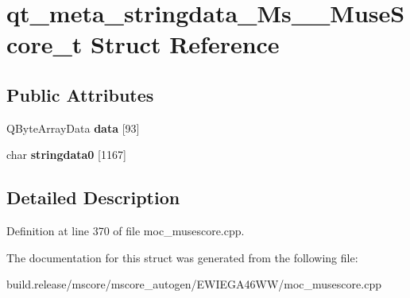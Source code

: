 \hypertarget{structqt__meta__stringdata___ms_____muse_score__t}{}\section{qt\+\_\+meta\+\_\+stringdata\+\_\+\+Ms\+\_\+\+\_\+\+Muse\+Score\+\_\+t Struct Reference}
\label{structqt__meta__stringdata___ms_____muse_score__t}
\subsection*{Public Attributes}
\begin{DoxyCompactItemize}
\item 
\mbox{\label{structqt__meta__stringdata___ms_____muse_score__t_a56893e9c7f3e0b4a8e928e897ae88fa8}} 
Q\+Byte\+Array\+Data {\bfseries data} \mbox{[}93\mbox{]}
\item 
\mbox{\label{structqt__meta__stringdata___ms_____muse_score__t_ad915dbe67f58461744be64bd1648b5ad}} 
char {\bfseries stringdata0} \mbox{[}1167\mbox{]}
\end{DoxyCompactItemize}


\subsection{Detailed Description}


Definition at line 370 of file moc\+\_\+musescore.\+cpp.



The documentation for this struct was generated from the following file\+:\begin{DoxyCompactItemize}
\item 
build.\+release/mscore/mscore\+\_\+autogen/\+E\+W\+I\+E\+G\+A46\+W\+W/moc\+\_\+musescore.\+cpp\end{DoxyCompactItemize}
